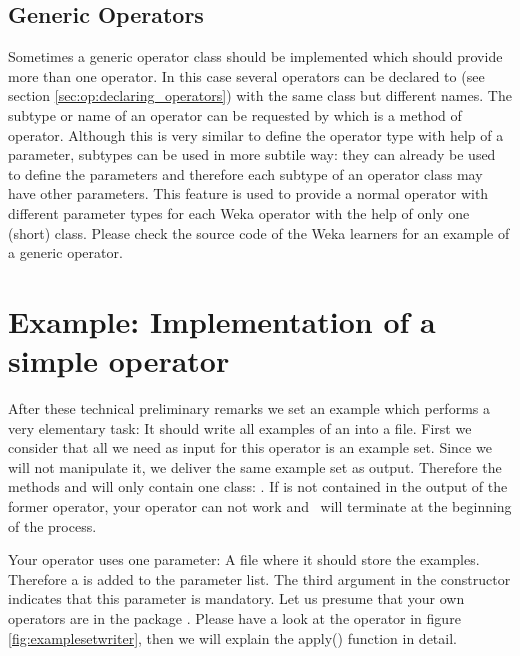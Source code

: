 \subsection{Generic Operators}
\label{sec:op:generic}

Sometimes a generic operator class should be implemented which should provide
more than one operator. In this case several operators can be declared to
\rapidminer (see section \ref{sec:op:declaring_operators}) with the same class but
different names. The subtype or name of an operator can be requested by
 which is a method of operator. Although this is very
similar to define the operator type with help of a parameter, subtypes can be
used in more subtile way: they can already be used to define the parameters and
therefore each subtype of an operator class may have other parameters. This
feature is used to provide a normal \rapidminer operator with different parameter
types for each Weka operator with the help of only one (short)
class. Please check the source code of the Weka learners for an example of a
generic operator.



\section{Example: Implementation of a simple operator}

After these technical preliminary remarks we set an example
which performs a very elementary task: It should write all examples of
an  into a file. First we consider that all we need as
input for this operator is an example set. Since we will not
manipulate it, we deliver the same example set as output. Therefore the methods
 and  will only contain
one class: . If  is
not contained in the output of the former operator, your operator can not work
and \rapidminer\ will terminate at the beginning of the process. 

Your operator uses one parameter: A file where it should store the
examples. Therefore a  is added to the parameter
list. The third argument in the constructor indicates that this parameter is
mandatory.
Let us presume that your own operators are in the package
. Please have a look at the operator in figure
\ref{fig:examplesetwriter}, then we will explain the apply() function in detail.

